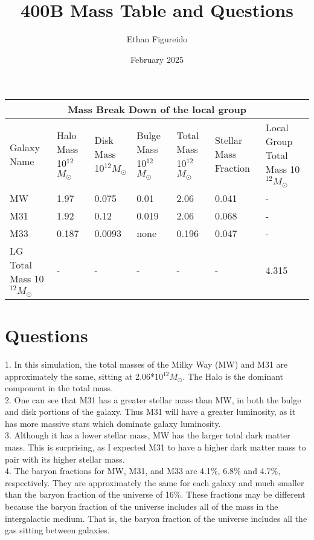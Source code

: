 \documentclass{article}
\begin{document}
\title{400B Mass Table and Questions}
\author{Ethan Figureido}
\date{February 2025}

\maketitle
   

\begin{longtable}{|p{1.8cm}|p{1.8cm}|p{1.8cm}|p{1.8cm}|p{1.8cm}|p{1.8cm}|p{1.8cm}|}
\hline
\multicolumn{7}{|c|}{Mass Break Down of the local group} \\
\hline
Galaxy Name & Halo Mass 10$^{12}$\(M_\odot\) & Disk Mass 10$^{12}$\(M_\odot\) & Bulge Mass 10$^{12}$\(M_\odot\) & Total Mass 10$^{12}$\(M_\odot\) & Stellar Mass Fraction & Local Group Total Mass 10$^{12}$\(M_\odot\)  \\
\hline
MW & 1.97 & 0.075 & 0.01 & 2.06 & 0.041 & -\\
\hline
M31 & 1.92 & 0.12 & 0.019 & 2.06 & 0.068 & - \\
\hline
M33  & 0.187 & 0.0093 & none & 0.196 & 0.047 & - \\
\hline
LG Total Mass 10$^{12}$\(M_\odot\) &-&-&-&-&-&4.315 \\
\hline

\end{longtable}


\section{Questions}


1. In this simulation, the total masses of the Milky Way (MW) and M31 are approximately the same, sitting at 2.06*10$^{12}$\(M_\odot\). The Halo is the dominant component in the total mass.
\\

2. One can see that M31 has a greater stellar mass than MW, in both the bulge and disk portions of the galaxy. Thus M31 will have a greater luminosity, as it has more massive stars which dominate galaxy luminosity.
\\

3. Although it has a lower stellar mass, MW has the larger total dark matter mass. This is surprising, as I expected M31 to have a higher dark matter mass to pair with its higher stellar mass.
\\

4. The baryon fractions for MW, M31, and M33 are 4.1\%, 6.8\% and 4.7\%, respectively. They are approximately the same for each galaxy and much smaller than the baryon fraction of the universe of 16\%. These fractions may be different because the baryon fraction of the universe includes all of the mass in the intergalactic medium. That is, the baryon fraction of the universe includes all the gas sitting between galaxies.
\end{document}
